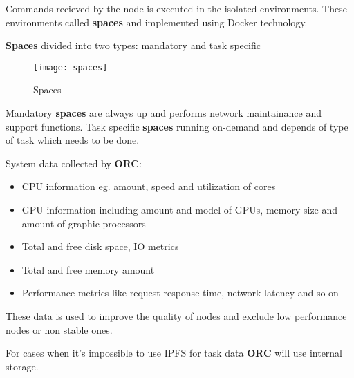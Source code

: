 Commands recieved by the node is executed in the isolated environments.
These environments called \textbf{spaces} and implemented using Docker technology.

\textbf{Spaces} divided into two types: mandatory and task specific

\begin{figure}[h]
\centering
\texttt{[image: spaces]}
\caption{Spaces}
\end{figure}

Mandatory \textbf{spaces} are always up and performs network maintainance and support functions.
Task specific \textbf{spaces} running on-demand and depends of type of task which needs to be done.

System data collected by \textbf{ORC}:

\begin{itemize}
    \item CPU information eg. amount, speed and utilization of cores
    \item GPU information including amount and model of GPUs, memory size and amount of graphic processors
    \item Total and free disk space, IO metrics
    \item Total and free memory amount
    \item Performance metrics like request-response time, network latency and so on
\end{itemize}

These data is used to improve the quality of nodes and exclude low performance nodes or non stable ones.

For cases when it's impossible to use IPFS for task data \textbf{ORC} will use internal storage.
